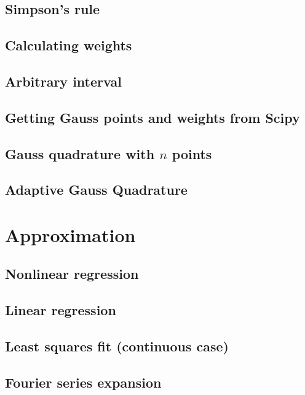 \documentclass[article,A4,12pt]{llncs}
\begin{document}
\subsection{Simpson's rule}


\subsection{Calculating weights}


\subsection{Arbitrary interval}


\subsection{Getting Gauss points and weights from Scipy}


\subsection{Gauss quadrature with $n$ points}


\subsection{Adaptive Gauss Quadrature}



\section{Approximation}


\subsection{Nonlinear regression}


\subsection{Linear regression}

\subsection{Least squares fit (continuous case)}


\subsection{Fourier series expansion}



\end{document}
